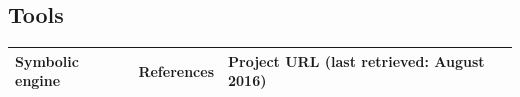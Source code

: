 \subsection{Tools}

\begin{table}[t]
  \centering
  \begin{adjustbox}{width=0.98\columnwidth} %
  \begin{tabular}{| l || c || l |}
    \hline      
    {\bf Symbolic engine} & {\bf References} & {\bf Project URL} (last retrieved: August 2016)  \\ \hline\hline
    
    

\end{tabular}
\end{adjustbox}
\end{table}
